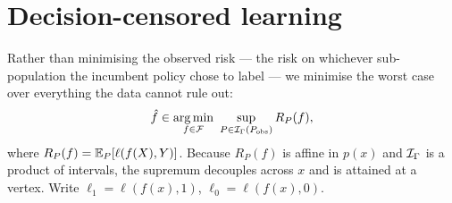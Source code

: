 \section{Decision-censored learning}
\label{sec:learning}

Rather than minimising the observed risk --- the risk on whichever
sub-population the incumbent policy chose to label --- we minimise the worst
case over everything the data cannot rule out:
\begin{equation}
  \hat f \in \argmin_{f\in\F}\ \sup_{P\in\I_\Gamma(P_{\mathrm{obs}})} R_P(f),
  \label{eq:dcl}
\end{equation}
where $R_P(f)=\mathbb{E}_P[\ell(f(X),Y)]$.
Because $R_P(f)$ is affine in $p(x)$ and $\mathcal{I}_\Gamma$ is a product of intervals,
the supremum decouples across $x$ and is attained at a vertex. Write
$\ell_1=\ell(f(x),1)$, $\ell_0=\ell(f(x),0)$.

